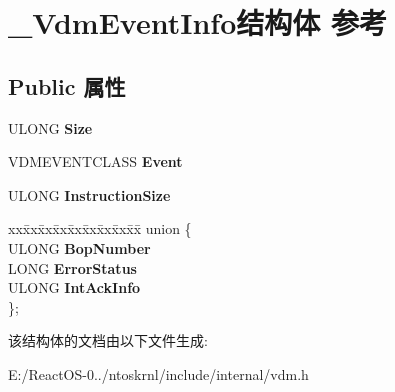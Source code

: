 \hypertarget{struct___vdm_event_info}{}\section{\+\_\+\+Vdm\+Event\+Info结构体 参考}
\label{struct___vdm_event_info}
\subsection*{Public 属性}
\begin{DoxyCompactItemize}
\item 
\mbox{\label{struct___vdm_event_info_a6effc6247af76e48abc494862d53edff}} 
U\+L\+O\+NG {\bfseries Size}
\item 
\mbox{\label{struct___vdm_event_info_a85035ab3992c26fe99f079e24ca7ed74}} 
V\+D\+M\+E\+V\+E\+N\+T\+C\+L\+A\+SS {\bfseries Event}
\item 
\mbox{\label{struct___vdm_event_info_ac6ae68b379efe0045a38987f84d01d36}} 
U\+L\+O\+NG {\bfseries Instruction\+Size}
\item 
\mbox{\label{struct___vdm_event_info_af234d413c1e293a959c91989d2e08829}} 
\begin{tabbing}
xx\=xx\=xx\=xx\=xx\=xx\=xx\=xx\=xx\=\kill
union \{\\
\>ULONG {\bfseries BopNumber}\\
\>LONG {\bfseries ErrorStatus}\\
\>ULONG {\bfseries IntAckInfo}\\
\}; \\

\end{tabbing}\end{DoxyCompactItemize}


该结构体的文档由以下文件生成\+:\begin{DoxyCompactItemize}
\item 
E\+:/\+React\+O\+S-\/0../ntoskrnl/include/internal/vdm.\+h\end{DoxyCompactItemize}
